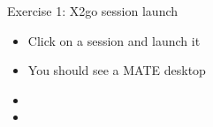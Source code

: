 \documentclass[handout]{beamer} %
\begin{document}
{\begin{frame}{Exercise 1: X2go session launch }
\begin{minipage}{0.5\textwidth}
\begin{figure}[H]
\end{figure}
\end{minipage} \hfill
\begin{minipage}{0.35\textwidth}
\begin{itemize}
\item Click on a session and launch it
\item You should see a MATE desktop
\item {\color{red}{Demonstration}} 
\item {\color{red}{Troubleshooting}}
\end{itemize}
\end{minipage}

\end{frame}
}
\end{document}
